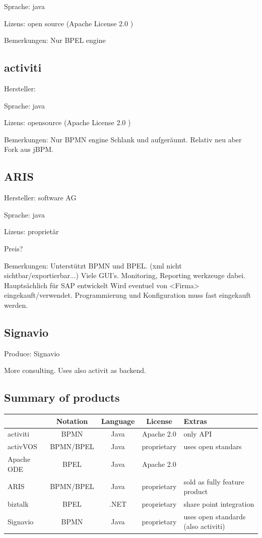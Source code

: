 \documentclass[paper=a4,twoside=false,BCOR=0mm,DIV=calc,fontsize=12pt]{scrartcl}
\begin{document}
Sprache: java

Lizens: open source (Apache License 2.0 )

Bemerkungen:
Nur BPEL engine



\subsection{activiti}
Hersteller:

Sprache: java

Lizens: opensource (Apache License 2.0 )


Bemerkungen:
Nur BPMN engine
Schlank und aufgeräumt. 
Relativ neu aber Fork aus jBPM.


\subsection{ARIS}
Hersteller: software AG

Sprache: java

Lizens: proprietär

Preis?

Bemerkungen:
Unterstützt BPMN und BPEL. (xml nicht sichtbar/exportierbar...)
Viele GUI's. 
Monitoring, Reporting werkzeuge dabei.
Hauptsächlich für SAP entwickelt
Wird eventuel von <Firma> eingekauft/verwendet.
Programmierung und Konfiguration muss fast eingekauft werden.


\subsection{Signavio}
Produce: Signavio

More consulting. Uses also activit as backend.


\subsection{Summary of products}


\begin{center}
\begin{tabular}{l c  c c l}}
\toprule

Name & Notation & Language & License & Extras \\

\midrule

activiti & BPMN & Java & Apache 2.0 & only API \\
activVOS & BPMN/BPEL & Java & proprietary &  uses open standars \\
Apache ODE & BPEL & Java & Apache 2.0 &   \\
ARIS & BPMN/BPEL & Java & proprietary &  sold as fully feature product \\
biztalk & BPEL & .NET & proprietary &  share point integration \\
Signavio & BPMN & Java & proprietary &  uses open standards (also activiti) \\


\bottomrule
\end{tabular}
\end{center}
\end{document}
